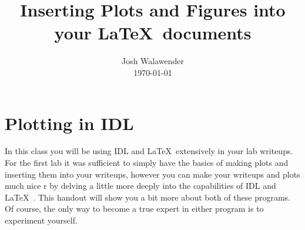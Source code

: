 \pagestyle{plain}


\newcommand{\plot}{\verb&plot& }
\newcommand{\oplot}{\verb&oplot& }
\newcommand{\oploterr}{\verb&oploterr& }
\newcommand{\setplot}{\verb&set\_plot& }
\newcommand{\device}{\verb&device& }
\newcommand{\startplot}{\verb&startplot& }
\newcommand{\eplot}{\verb&endplot& }
\newcommand{\xyouts}{\verb&xyouts& }
\newcommand{\lab}{\verb&label& }
\newcommand{\refer}{\verb&ref& }
\newcommand{\openplotps}{\verb&openplotps& }
\newcommand{\closeplotps}{\verb&closeplotps& }

\setlength{\parskip}{.02in}



\title{Inserting Plots and Figures into your \LaTeX\ documents}

\author{Josh Walawender \\ \today} 


\section{Plotting in IDL}\label{idl}

	In this class you will be using IDL and \LaTeX\ extensively in
your lab writeups.  For the first lab it was sufficient to simply have
the basics of making plots and inserting them into your writeups,
however you can make your writeups and plots much nice r by delving a
little more deeply into the capabilities of IDL and \LaTeX\ .  This
handout will show you a bit more about both of these programs.  Of
course, the only way to become a true expert in either program is to
experiment yourself. 

